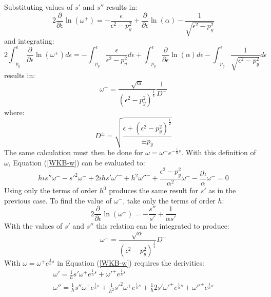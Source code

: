 		Substituting values of $s'$ and $s''$ results in:
		\begin{equation}
			2\frac{\partial}{\partial\epsilon}\ln(\omega^{+})=-\frac{\epsilon}{\epsilon^{2}-p_{y}^{2}}+\frac{\partial}{\partial\epsilon}\ln(\alpha)-\frac{1}{\sqrt{\epsilon^{2}-p_{y}^{2}}}
		\end{equation}
		and integrating:
		\begin{equation}
			2\int_{-p_{y}}^{\epsilon}\frac{\partial}{\partial\epsilon}\ln(\omega^{+})d\epsilon=-\int_{-p_{y}}^{\epsilon}\frac{\epsilon}{\epsilon^{2}-p_{y}^{2}}d\epsilon+\int_{-p_{y}}^{\epsilon}\frac{\partial}{\partial\epsilon}\ln(\alpha) d\epsilon-\int_{-p_{y}}^{\epsilon}\frac{1}{\sqrt{\epsilon^{2}-p_{y}^{2}}}d\epsilon
		\end{equation}
		results in:
		\begin{equation}
			\omega^{+}=\frac{\sqrt{\alpha}}{\left(\epsilon^{2}-p_{y}^{2}\right)^{\frac{1}{4}}}\frac{1}{D^{-}}
		\end{equation}
		where:
		\begin{equation}
			D^{\pm}=\sqrt{\frac{\epsilon+\left(\epsilon^{2}-p_{y}^{2}\right)^{\frac{1}{2}}}{\pm p_{y}}}
		\end{equation}
		The same calculation must then be done for $\omega=\omega^{-}e^{-\frac{i}{h}s}$. With this definition of $\omega$, Equation (\ref{WKB-w}) can be evaluated to:
		\begin{equation}
			his''\omega^{-}-s'^{2}\omega^{-}+2ihs'\omega'^{-}+h^{2}\omega''^{-}+\frac{\epsilon^{2}-p_{y}^{2}}{\alpha^{2}}\omega^{-}-\frac{ih}{\alpha}\omega^{-}=0
		\end{equation}
		Using only the terms of order $h^0$ produces the same result for $s'$ as in the previous case. To find the value of $\omega^{-}$, take only the terms of order $h$:
		\begin{equation}
			2\frac{\partial}{\partial\epsilon}\ln(\omega^{-})=-\frac{s''}{s'}+\frac{1}{\alpha s'}
		\end{equation}
		With the values of $s'$ and $s''$ this relation can be integrated to produce:
		\begin{equation}
			\omega^{-}=\frac{\sqrt{\alpha}}{\left(\epsilon^{2}-p_{y}^{2}\right)^{\frac{1}{4}}}D^{-}
		\end{equation}
		With $\omega=\omega^{+}e^{\frac{1}{h}s}$ in Equation (\ref{WKB-w}) requires the derivities:
		\begin{gather}
			\omega'=\frac{1}{h}s'\omega^{+}e^{\frac{1}{h}s}+\omega'^{+}e^{\frac{1}{h}s}\\
			\omega''=\frac{1}{h}s''\omega^{+}e^{\frac{1}{h}s}+\frac{1}{h^{2}}s'^{2}\omega^{+}e^{\frac{1}{h}s}+\frac{1}{h}2s'\omega'^{+}e^{\frac{1}{h}s}+\omega''^{+}e^{\frac{1}{h}s}
		\end{gather}

